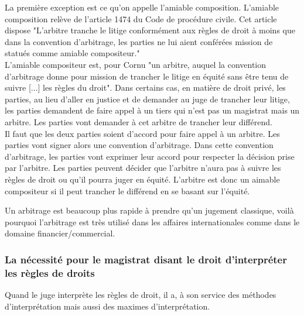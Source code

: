 La première exception est ce qu'on appelle l'amiable composition. L'amiable composition relève de l'article 1474 du Code de procédure civile. Cet article dispose "L'arbitre tranche le litige conformément aux règles de droit à moins que dans la convention d'arbitrage, les parties ne lui aient conférées mission de statués comme amiable compositeur." \\
L'amiable compositeur est, pour Cornu "un arbitre, auquel la convention d'arbitrage donne pour mission de trancher le litige en équité sans être tenu de suivre [...] les règles du droit". Dans certains cas, en matière de droit privé, les parties, au lieu d'aller en justice et de demander au juge de trancher leur litige, les parties demandent de faire appel à un tiers qui n'est pas un magistrat mais un arbitre. Les parties vont demander à cet arbitre de trancher leur différend. \\
Il faut que les deux parties soient d'accord pour faire appel à un arbitre. Les parties vont signer alors une convention d'arbitrage. Dans cette convention d'arbitrage, les parties vont exprimer leur accord pour respecter la décision prise par l'arbitre. Les parties peuvent décider que l'arbitre n'aura pas à suivre les règles de droit ou qu'il pourra juger en équité. L'arbitre est donc un aimable compositeur si il peut trancher le différend en se basant sur l'équité.


Un arbitrage est beaucoup plus rapide à prendre qu'un jugement classique, voilà pourquoi l'arbitrage est très utilisé dans les affaires internationales comme dans le domaine financier/commercial. 

\subsubsection{La nécessité pour le magistrat disant le droit d'interpréter les règles de droits}

Quand le juge interprète les règles de droit, il a, à son service des méthodes d'interprétation mais aussi des maximes d'interprétation.


